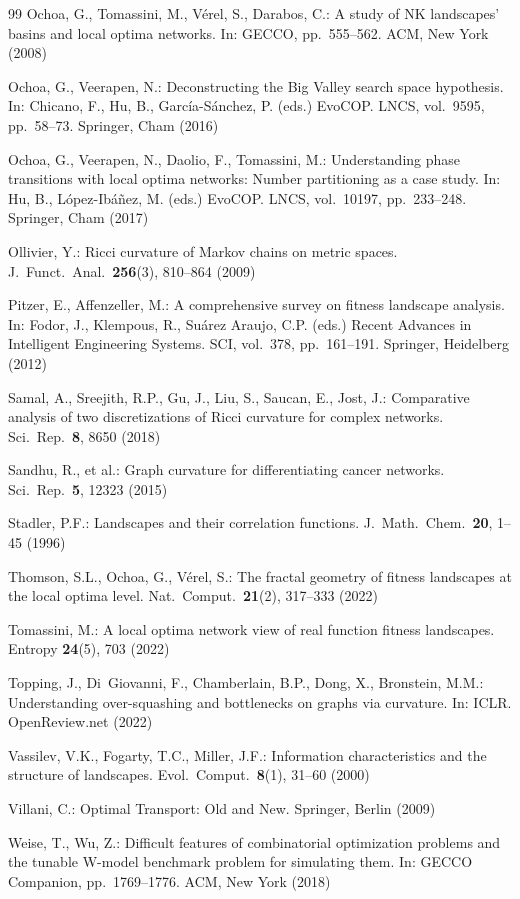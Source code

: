 \documentclass[runningheads]{llncs}
\begin{document}
\begin{thebibliography}{99}
Ochoa, G., Tomassini, M., V\'erel, S., Darabos, C.: A study of NK landscapes' basins and local optima networks. In: GECCO, pp.~555--562. ACM, New York (2008)

Ochoa, G., Veerapen, N.: Deconstructing the Big Valley search space hypothesis. In: Chicano, F., Hu, B., Garc\'ia-S\'anchez, P. (eds.) EvoCOP. LNCS, vol.~9595, pp.~58--73. Springer, Cham (2016)

Ochoa, G., Veerapen, N., Daolio, F., Tomassini, M.: Understanding phase transitions with local optima networks: Number partitioning as a case study. In: Hu, B., L\'opez-Ib\'a\~nez, M. (eds.) EvoCOP. LNCS, vol.~10197, pp.~233--248. Springer, Cham (2017)

Ollivier, Y.: Ricci curvature of Markov chains on metric spaces. J.\ Funct.\ Anal.\ \textbf{256}(3), 810--864 (2009)

Pitzer, E., Affenzeller, M.: A comprehensive survey on fitness landscape analysis. In: Fodor, J., Klempous, R., Su\'arez Araujo, C.P. (eds.) Recent Advances in Intelligent Engineering Systems. SCI, vol.~378, pp.~161--191. Springer, Heidelberg (2012)

Samal, A., Sreejith, R.P., Gu, J., Liu, S., Saucan, E., Jost, J.: Comparative analysis of two discretizations of Ricci curvature for complex networks. Sci.\ Rep.\ \textbf{8}, 8650 (2018)

Sandhu, R., et al.: Graph curvature for differentiating cancer networks. Sci.\ Rep.\ \textbf{5}, 12323 (2015)

Stadler, P.F.: Landscapes and their correlation functions. J.\ Math.\ Chem.\ \textbf{20}, 1--45 (1996)

Thomson, S.L., Ochoa, G., V\'erel, S.: The fractal geometry of fitness landscapes at the local optima level. Nat.\ Comput.\ \textbf{21}(2), 317--333 (2022)

Tomassini, M.: A local optima network view of real function fitness landscapes. Entropy \textbf{24}(5), 703 (2022)

Topping, J., Di~Giovanni, F., Chamberlain, B.P., Dong, X., Bronstein, M.M.: Understanding over-squashing and bottlenecks on graphs via curvature. In: ICLR. OpenReview.net (2022)

Vassilev, V.K., Fogarty, T.C., Miller, J.F.: Information characteristics and the structure of landscapes. Evol.\ Comput.\ \textbf{8}(1), 31--60 (2000)

Villani, C.: Optimal Transport: Old and New. Springer, Berlin (2009)

Weise, T., Wu, Z.: Difficult features of combinatorial optimization problems and the tunable W-model benchmark problem for simulating them. In: GECCO Companion, pp.~1769--1776. ACM, New York (2018)

\end{thebibliography}
\end{document}
